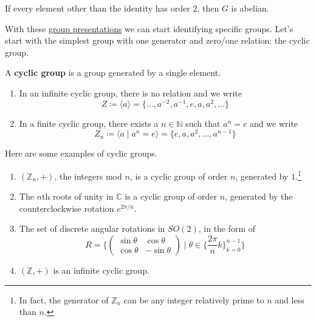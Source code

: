   \begin{theorem}
    \label{thm:groups-of-exponent-2-are-abelian}
    If every element other than the identity has order 2, then $G$ is abelian. 
  \end{theorem}

  With these \hyperref[def:group-presentations]{group presentations} we can start identifying specific groups. Let's start with the simplest group with one generator and zero/one relation: the cyclic group. 

  \begin{definition}
    \label{def:cyclic-group}
    A \textbf{cyclic group} is a group generated by a single element. 
    \begin{enumerate}
      \item In an infinite cyclic group, there is no relation and we write 
      \begin{equation}
        Z \coloneqq \langle a \rangle = \{ \ldots, a^{-2}, a^{-1}, e, a, a^2, \ldots \}
      \end{equation}

      \item In a finite cyclic group, there exists a $n \in \mathbb{N}$ such that $a^{n} = e$ and we write 
      \begin{equation}
        Z_n \coloneqq \langle a \mid a^n = e \rangle = \{e, a, a^2, \ldots, a^{n-1} \}
      \end{equation}
    \end{enumerate}
  \end{definition} 
  
  \begin{example}
    \label{ex:cyclic-groups}
 
    Here are some examples of cyclic groups. 
    \begin{enumerate}
      \item $(\mathbb{Z}_n, +)$, the integers mod $n$, is a cyclic group of order $n$, generated by $1$.\footnote{In fact, the generator of $\mathbb{Z}_n$ can be any integer relatively prime to $n$ and less than $n$.} 
      \item The $n$th roots of unity in $\mathbb{C}$ is a cyclic group of order $n$, generated by the counterclockwise rotation $e^{2\pi/n}$. 
      \item The set of discrete angular rotations in $SO(2)$, in the form of 
      \begin{equation}
        R =  \bigg\{ \begin{pmatrix}
        \sin{\theta} & \cos{\theta} \\
        \cos{\theta} & -\sin{\theta}
        \end{pmatrix}\; \bigg| \; \theta \in \Big\{\frac{2 \pi}{n} k\Big\}_{k = 0}^{n-1} \bigg\}
      \end{equation}

      \item $(\mathbb{Z}, +)$ is an infinite cyclic group. 
    \end{enumerate}
  \end{example}

